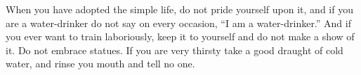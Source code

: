 When you have  adopted the simple life,  do not pride yourself upon  it, and if
you are a water-drinker do not say on every occasion, ``I am a water-drinker.''
And if you ever want to train laboriously,  keep it to yourself and do not make
a show  of it.  Do not embrace  statues. If  you are very  thirsty take  a good
draught of cold water, and rinse you mouth and tell no one.
